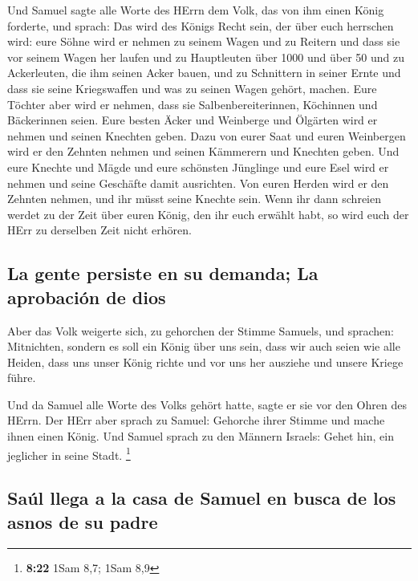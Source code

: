  Und Samuel sagte alle Worte des HErrn dem Volk, das von
ihm einen König forderte,  und sprach: Das wird des
Königs Recht sein, der über euch herrschen wird: eure Söhne wird er
nehmen zu seinem Wagen und zu Reitern und dass sie vor seinem Wagen her
laufen  und zu Hauptleuten über 1000 und über 50 und zu
Ackerleuten, die ihm seinen Acker bauen, und zu Schnittern in seiner
Ernte und dass sie seine Kriegswaffen und was zu seinen Wagen gehört,
machen.  Eure Töchter aber wird er nehmen, dass sie
Salbenbereiterinnen, Köchinnen und Bäckerinnen seien. 
Eure besten Äcker und Weinberge und Ölgärten wird er nehmen und seinen
Knechten geben.  Dazu von eurer Saat und euren Weinbergen
wird er den Zehnten nehmen und seinen Kämmerern und Knechten geben.
 Und eure Knechte und Mägde und eure schönsten Jünglinge
und eure Esel wird er nehmen und seine Geschäfte damit ausrichten.
 Von euren Herden wird er den Zehnten nehmen, und ihr
müsst seine Knechte sein.  Wenn ihr dann schreien werdet
zu der Zeit über euren König, den ihr euch erwählt habt, so wird euch
der HErr zu derselben Zeit nicht erhören.

\hypertarget{la-gente-persiste-en-su-demanda-la-aprobaciuxf3n-de-dios}{%
\subsection{La gente persiste en su demanda; La aprobación de
dios}\label{la-gente-persiste-en-su-demanda-la-aprobaciuxf3n-de-dios}}

 Aber das Volk weigerte sich, zu gehorchen der Stimme
Samuels, und sprachen: Mitnichten, sondern es soll ein König über uns
sein,  dass wir auch seien wie alle Heiden, dass uns
unser König richte und vor uns her ausziehe und unsere Kriege führe.

 Und da Samuel alle Worte des Volks gehört hatte, sagte
er sie vor den Ohren des HErrn.  Der HErr aber sprach zu
Samuel: Gehorche ihrer Stimme und mache ihnen einen König. Und Samuel
sprach zu den Männern Israels: Gehet hin, ein jeglicher in seine Stadt.
\footnote{\textbf{8:22} 1Sam 8,7; 1Sam 8,9}

\hypertarget{sauxfal-llega-a-la-casa-de-samuel-en-busca-de-los-asnos-de-su-padre}{%
\subsection{Saúl llega a la casa de Samuel en busca de los asnos de su
padre}\label{sauxfal-llega-a-la-casa-de-samuel-en-busca-de-los-asnos-de-su-padre}}

